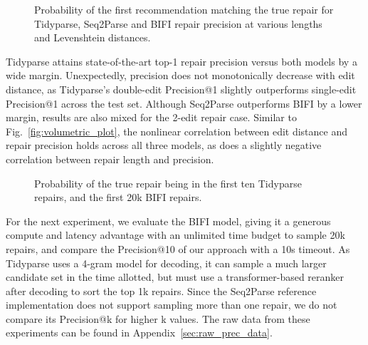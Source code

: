 \documentclass[sigplan,review,acmsmall,nonacm,screen,anonymous]{acmart}\settopmatter{printfolios=false,printccs=false,printacmref=false}
\begin{document}
\begin{figure}[h!]
\resizebox{.29\textwidth}{!}{}\hspace{0.5cm}
\resizebox{.29\textwidth}{!}{}\hspace{0.5cm}
\resizebox{.29\textwidth}{!}{}
\caption{Probability of the first recommendation matching the true repair for Tidyparse, Seq2Parse and BIFI repair precision at various lengths and Levenshtein distances.}\label{fig:len_dist_prec}
\end{figure}\vspace{-0.2cm}

Tidyparse attains state-of-the-art top-1 repair precision versus both models by a wide margin. Unexpectedly, precision does not monotonically decrease with edit distance, as Tidyparse's double-edit Precision@1 slightly outperforms single-edit Precision@1 across the test set. Although Seq2Parse outperforms BIFI by a lower margin, results are also mixed for the 2-edit repair case. Similar to Fig.~\ref{fig:volumetric_plot}, the nonlinear correlation between edit distance and repair precision holds across all three models, as does a slightly negative correlation between repair length and precision.

\begin{figure}
\vspace{-0.1cm}
\resizebox{.24\textwidth}{!}{}
\resizebox{.24\textwidth}{!}{}
\caption{Probability of the true repair being in the first ten Tidyparse repairs, and the first 20k BIFI repairs.}\label{fig:len_dist_prec}
\vspace{-0.3cm}
\end{figure}

For the next experiment, we evaluate the BIFI model, giving it a generous compute and latency advantage with an unlimited time budget to sample 20k repairs, and compare the Precision@10 of our approach with a 10s timeout. As Tidyparse uses a 4-gram model for decoding, it can sample a much larger candidate set in the time allotted, but must use a transformer-based reranker after decoding to sort the top 1k repairs. Since the Seq2Parse reference implementation does not support sampling more than one repair, we do not compare its Precision@k for higher k values. The raw data from these experiments can be found in Appendix~\ref{sec:raw_prec_data}.
\end{document}
